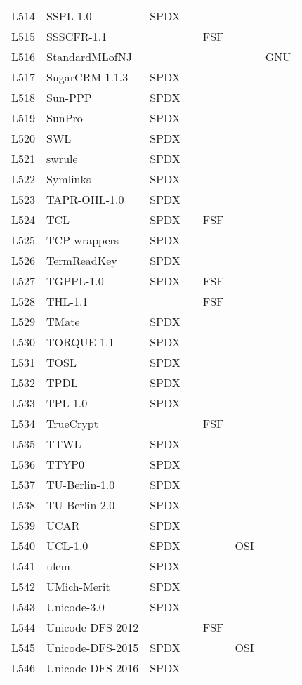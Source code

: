 \begin{longtable}[h]{m{2cm} | m{7cm} | c | c | c | c | c}
L514 & SSPL-1.0 & SPDX &  &  &  &  \\
L515 & SSSCFR-1.1 &  &  & FSF &  &  \\
L516 & StandardMLofNJ &  &  &  &  & GNU \\
L517 & SugarCRM-1.1.3 & SPDX &  &  &  &  \\
L518 & Sun-PPP & SPDX &  &  &  &  \\
L519 & SunPro & SPDX &  &  &  &  \\
L520 & SWL & SPDX &  &  &  &  \\
L521 & swrule & SPDX &  &  &  &  \\
L522 & Symlinks & SPDX &  &  &  &  \\
L523 & TAPR-OHL-1.0 & SPDX &  &  &  &  \\
L524 & TCL & SPDX &  & FSF &  &  \\
L525 & TCP-wrappers & SPDX &  &  &  &  \\
L526 & TermReadKey & SPDX &  &  &  &  \\
L527 & TGPPL-1.0 & SPDX &  & FSF &  &  \\
L528 & THL-1.1 &  &  & FSF &  &  \\
L529 & TMate & SPDX &  &  &  &  \\
L530 & TORQUE-1.1 & SPDX &  &  &  &  \\
L531 & TOSL & SPDX &  &  &  &  \\
L532 & TPDL & SPDX &  &  &  &  \\
L533 & TPL-1.0 & SPDX &  &  &  &  \\
L534 & TrueCrypt &  &  & FSF &  &  \\
L535 & TTWL & SPDX &  &  &  &  \\
L536 & TTYP0 & SPDX &  &  &  &  \\
L537 & TU-Berlin-1.0 & SPDX &  &  &  &  \\
L538 & TU-Berlin-2.0 & SPDX &  &  &  &  \\
L539 & UCAR & SPDX &  &  &  &  \\
L540 & UCL-1.0 & SPDX &  &  & OSI &  \\
L541 & ulem & SPDX &  &  &  &  \\
L542 & UMich-Merit & SPDX &  &  &  &  \\
L543 & Unicode-3.0 & SPDX &  &  &  &  \\
L544 & Unicode-DFS-2012 &  &  & FSF &  &  \\
L545 & Unicode-DFS-2015 & SPDX &  &  & OSI &  \\
L546 & Unicode-DFS-2016 & SPDX &  &  &  &  \\

\end{longtable}

